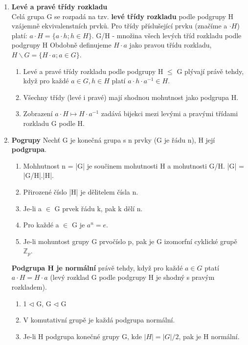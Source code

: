 \documentclass[12pt,a4paper]{article}
\begin{document}
\begin{enumerate}
		\item \textbf{Levé a pravé třídy rozkladu} \\
		Celá grupa G se rozpadá na tzv. \textbf{levé třídy rozkladu} podle podgrupy H vzájemně ekvivalenstních prvků.  Pro třídy příslušející prvku (značíme a $\cdot H$) platí: $a \cdot H = \{a \cdot h; h \in H\}$. G/H - množina všech levých tříd rozkladu podle podgrupy H
		Obdobně definujeme $H \cdot a$ jako pravou třídu rozkladu, $H \backslash G = \{H \cdot a; a \in G\}$.
		
		\begin{enumerate}
			\item Levé a pravé třídy rozkladu podle podgrupy H $\leq$ G plývají právě tehdy, když pro každé $a \in G, h \in H$ platí $a \cdot h \cdot a^{-1} \in H$.
			\item Všechny třídy (levé i pravé) mají shodnou mohutnost jako podgrupa H.
			\item Zobrazení $a \cdot H \mapsto H \cdot a^{-1}$ zadává bijekci mezi levými a pravými třídami rozkladu G podle H.
		\end{enumerate}
	
	\item \textbf{Pogrupy}
		Nechť G je konečná grupa s n prvky (G je řádu n), H její \textbf{podgrupa}.
		\begin{enumerate}
			\item Mohhutnost n = |G| je součinem mohutnosti H a mohutnosti G/H. |G| = |G/H|.|H|.
			\item Přirozené číslo |H| je dělitelem čísla n.
			\item Je-li a $\in$ G prvek řádu k, pak k dělí n.
			\item Pro každé a $\in$ G je $a^n = e$.
			\item Je-li mohuntost grupy G prvočíslo p, pak je G izomorfní cyklické grupě $\mathbb{Z}_p$. 
		\end{enumerate}
	
		\textbf{Podgrupa H je normální} právě tehdy, když pro každé $a \in G$ ptatí $a\cdot H = H\cdot a$ (levý rozklad G podle podgrupy H je shodný s pravým rozkladem).
		\begin{enumerate}
			\item 1 $\lhd$ G, G $\lhd$ G
			\item V komutativní grupě je každá podgrupa normální.
			\item Je-li H podgrupa konečné grupy G, kde $|H|=|G|/2$, pak je H normální.
		\end{enumerate}
	

\end{enumerate}
\end{document}
